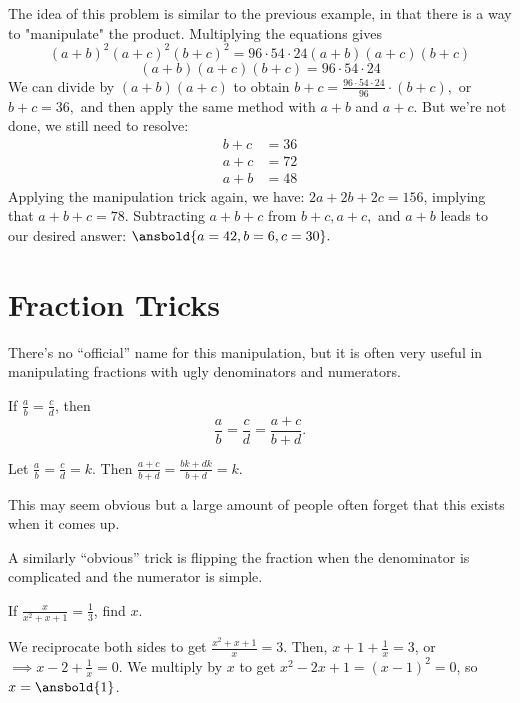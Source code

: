 \documentclass{article}
\begin{document}
\begin{sol}
The idea of this problem is similar to the previous example, in that there is a way to "manipulate" the product. Multiplying the equations gives
\[(a+b)^2(a+c)^2(b+c)^2 = 96 \cdot 54 \cdot 24(a+b)(a+c)(b+c)\]
\[(a+b)(a+c)(b+c)= 96 \cdot 54 \cdot 24\]
We can divide by $(a+b)(a+c)$ to obtain $b+c = \frac{96 \cdot 54 \cdot 24}{96} \cdot (b+c),$ or $b+c = 36,$ and then apply the same method with $a+b$ and $a+c.$ But we're not done, we still need to resolve:
\begin{align*}
b+c &= 36 \\
a+c &= 72\\
a+b &= 48
\end{align*}
Applying the manipulation trick again, we have: $2a +2b+2c = 156$, implying that $a+b+c = 78.$ Subtracting $a+b+c$ from $b+c,a+c,$ and $a+b$ leads to our desired answer: $\ansbold{a = 42, b = 6, c = 30}.$
\end{sol}

\section{Fraction Tricks}
There's no ``official'' name for this manipulation, but it is often very useful in manipulating fractions with ugly denominators and numerators. 
\begin{theo}
If $\frac{a}{b}=\frac{c}{d}$, then
\[\frac{a}{b}=\frac{c}{d}=\frac{a+c}{b+d}.\]
\end{theo}

\begin{pro}
Let $\frac{a}{b}=\frac{c}{d}=k$. Then $\frac{a+c}{b+d}=\frac{bk+dk}{b+d}=k$.
\end{pro}

This may seem obvious but a large amount of people often forget that this exists when it comes up.

A similarly ``obvious'' trick is flipping the fraction when the denominator is complicated and the numerator is simple.

\begin{exam}[Classic]
If $\frac{x}{x^2+x+1}=\frac{1}{3}$, find $x$.
\end{exam}

\begin{sol}
We reciprocate both sides to get $\frac{x^2+x+1}{x}=3$. Then, $x+1+\frac{1}{x}=3$, or $\implies x-2+\frac{1}{x}=0$. We multiply by $x$ to get $x^2-2x+1=(x-1)^2=0$, so $x=\ansbold{1}$.
\end{sol}
\end{document}
